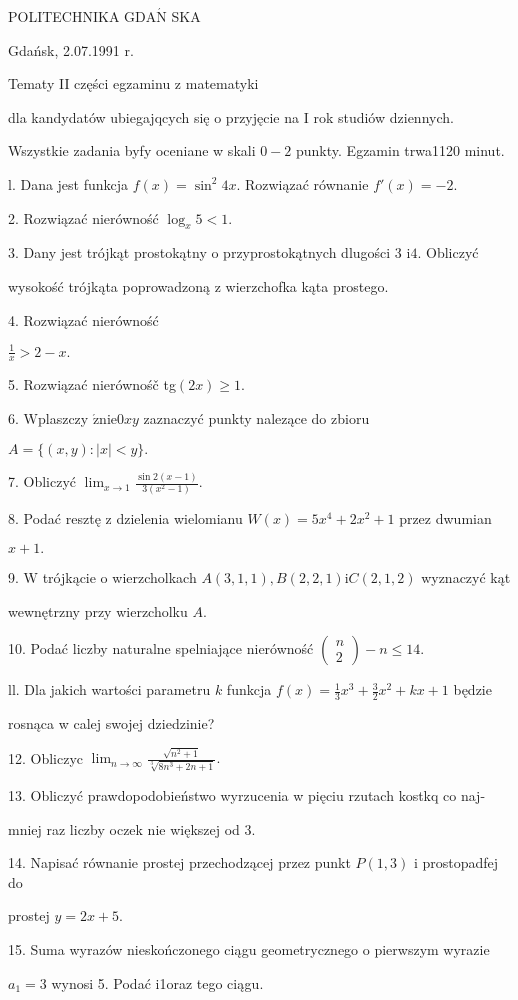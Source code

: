 \documentclass[a4paper,12pt]{article}
\begin{document}
POLITECHNIKA $\mathrm{G}\mathrm{D}\mathrm{A}\acute{\mathrm{N}}$ SKA

Gdańsk, 2.07.1991 r.

Tematy II części egzaminu z matematyki

dla kandydatów ubiegajqcych się o przyjęcie na I rok studiów dziennych.

Wszystkie zadania byfy oceniane w skali $0-2$ punkty. Egzamin trwa1120 minut.

l. Dana jest funkcja $f(x)=\sin^{2}4x$. Rozwiązać równanie $f'(x)=-2.$

2. Rozwiązać nierówność $\log_{x}5<1.$

3. Dany jest trójkąt prostokątny o przyprostokątnych dlugości 3 $\mathrm{i}4$. Obliczyć

wysokość trójkąta poprowadzoną z wierzchofka kąta prostego.

4. Rozwiązać nierówność

$\displaystyle \frac{1}{x}>2-x.$

5. Rozwiązać nierównośč tg$(2x)\geq 1.$

6. $\mathrm{W}\mathrm{p}$laszczy $\acute{\mathrm{z}}\mathrm{n}\mathrm{i}\mathrm{e}0xy$ zaznaczyć punkty nalezące do zbioru

$A=\{(x,y):|x|<y\}.$

7. Obliczyć $\displaystyle \lim_{x\rightarrow 1}\frac{\sin 2(x-1)}{3(x^{2}-1)}.$

8. Podać resztę z dzielenia wielomianu $W(x) = 5x^{4}+2x^{2}+1$ przez dwumian

$x+1.$

9. $\mathrm{W}$ trójkącie o wierzcholkach $A(3,1,1), B(2,2,1) \mathrm{i}C(2,1,2)$ wyznaczyć kąt

wewnętrzny przy wierzcholku $A.$

10. Podać liczby naturalne spelniające nierówność $\left(\begin{array}{l}
n\\
2
\end{array}\right) -n\leq 14.$

ll. Dla jakich wartości parametru $k$ funkcja $f(x) = \displaystyle \frac{1}{3}x^{3}+\frac{3}{2}x^{2}+kx+1$ będzie

rosnąca w calej swojej dziedzinie?

12. Obliczyc $\displaystyle \lim_{n\rightarrow\infty}\frac{\sqrt{n^{2}+1}}{\sqrt[3]{8n^{3}+2n+1}}.$

13. Obliczyć prawdopodobieństwo wyrzucenia w pięciu rzutach kostkq co naj-

mniej raz liczby oczek nie większej od 3.

14. Napisać równanie prostej przechodzącej przez punkt $P(1,3)$ i prostopadfej do

prostej $y=2x+5.$

15. Suma wyrazów nieskończonego ciągu geometrycznego o pierwszym wyrazie

$a_{1}=3$ wynosi 5. Podać i1oraz tego ciągu.
\end{document}
